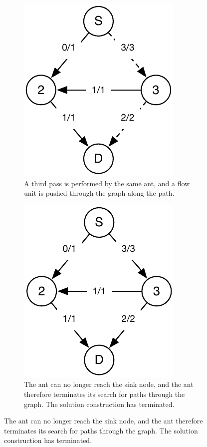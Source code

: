 \begin{figure}[htp]
\begin{subfigure}[t]{0.30\textwidth}
  \centering
  \includegraphics[width=\linewidth,height=\linewidth, keepaspectratio]{alternated_move_and_push4.pdf}
  \caption{A third pass is performed by the same ant, and a flow unit is pushed through the graph along the path.}\label{fig:alternated_move_and_push_fig4}
\end{subfigure}
\quad
\begin{subfigure}[t]{0.30\textwidth}
  \centering
  \includegraphics[width=\linewidth,height=\linewidth, keepaspectratio]{alternated_move_and_push5.pdf}
  \caption{The ant can no longer reach the sink node, and the ant therefore terminates its search for paths through the graph. The solution construction has terminated.}\label{fig:alternated_move_and_push_fig5}
\end{subfigure}



\end{figure}

